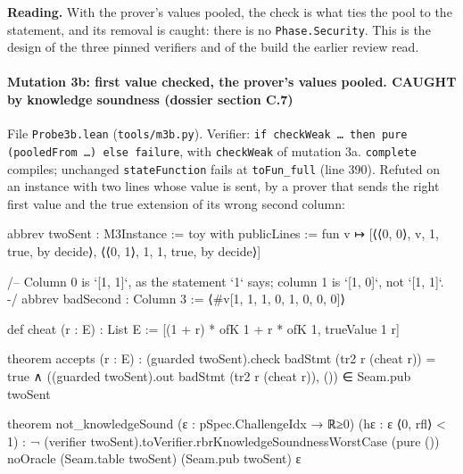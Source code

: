 \textbf{Reading.} With the prover's values pooled, the check is what ties the pool to the statement, and its removal is caught: there is no \texttt{Phase.\allowbreak{}Security}. This is the design of the three pinned verifiers and of the build the earlier review read.

\paragraph{Mutation 3b: first value checked, the prover's values pooled. CAUGHT by knowledge soundness (dossier section C.7)}\label{sec:gen-pubinput-C7}

File \texttt{Probe3b.\allowbreak{}lean} (\texttt{tools/\allowbreak{}m3b.\allowbreak{}py}). Verifier: \texttt{i\allowbreak{}f\allowbreak{} c\allowbreak{}h\allowbreak{}e\allowbreak{}c\allowbreak{}k\allowbreak{}W\allowbreak{}e\allowbreak{}a\allowbreak{}k\allowbreak{} …\allowbreak{} t\allowbreak{}h\allowbreak{}e\allowbreak{}n\allowbreak{} p\allowbreak{}u\allowbreak{}r\allowbreak{}e\allowbreak{} (\allowbreak{}p\allowbreak{}o\allowbreak{}o\allowbreak{}l\allowbreak{}e\allowbreak{}d\allowbreak{}F\allowbreak{}r\allowbreak{}o\allowbreak{}m\allowbreak{} …\allowbreak{})\allowbreak{} e\allowbreak{}l\allowbreak{}s\allowbreak{}e\allowbreak{} f\allowbreak{}a\allowbreak{}i\allowbreak{}l\allowbreak{}u\allowbreak{}r\allowbreak{}e}, with \texttt{checkWeak} of mutation 3a. \texttt{complete} compiles; unchanged \texttt{stateFunction} fails at \texttt{toFun\_\allowbreak{}full} (line 390). Refuted on an instance with two lines whose value is sent, by a prover that sends the right first value and the true extension of its wrong second column:

\begin{leancode}
abbrev twoSent : M3Instance :=
  { toy with publicLines := fun v ↦
      [⟨⟨0, 0⟩, v, 1, true, by decide⟩, ⟨⟨0, 1⟩, 1, 1, true, by decide⟩] }

/-- Column 0 is `[1, 1]`, as the statement `1` says; column 1 is `[1, 0]`, not `[1, 1]`. -/
abbrev badSecond : Column 3 := ⟨#v[1, 1, 1, 0, 1, 0, 0, 0]⟩

def cheat (r : E) : List E := [(1 + r) * ofK 1 + r * ofK 1, trueValue 1 r]

theorem accepts (r : E) :
    (guarded twoSent).check badStmt (tr2 r (cheat r)) = true ∧
      ((guarded twoSent).out badStmt (tr2 r (cheat r)), ()) ∈ Seam.pub twoSent

theorem not_knowledgeSound (ε : pSpec.ChallengeIdx → ℝ≥0) (hε : ε ⟨0, rfl⟩ < 1) :
    ¬ (verifier twoSent).toVerifier.rbrKnowledgeSoundnessWorstCase (pure ()) noOracle
      (Seam.table twoSent) (Seam.pub twoSent) ε
\end{leancode}

